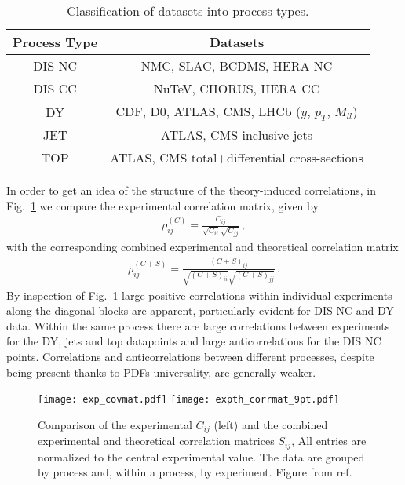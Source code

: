     \begin{table}[t]
        \centering
        \renewcommand*{\arraystretch}{1.3}
        \begin{tabular}{|c|c|}
          \hline
          Process Type  & Datasets \\
          \hline
          DIS NC  &   NMC, SLAC, BCDMS, HERA NC \\
          DIS CC  &   NuTeV, CHORUS, HERA CC \\
          DY  & CDF, D0, ATLAS, CMS, LHCb ($y$, $p_T$, $M_{ll}$) \\
          JET  & ATLAS, CMS inclusive jets \\
          TOP  & ATLAS, CMS total+differential cross-sections \\
          \hline
        \end{tabular}
        \caption{\label{eq:expclassification}
         Classification of  datasets into  process types.
        }
    \end{table}
    In order to get an idea of the structure of the theory-induced correlations,
    in Fig.~\ref{fig:covmats} we compare the experimental correlation matrix, given by
    \begin{align}
        \rho^{(C)}_{ij} = \frac{C_{ij}}{\sqrt{C_{ii}}\sqrt{C_{jj}}}\,,
    \end{align}
    with the corresponding combined experimental and theoretical correlation matrix
    \begin{align}
        \rho^{(C+S)}_{ij} = \frac{\left(C+S\right)_{ij}}{ \sqrt{\left(C+S\right)_{ii}} \sqrt{\left(C+S\right)_{jj}} }\,.
    \end{align}
    By inspection of Fig.~\ref{fig:covmats} large positive correlations within individual experiments along 
    the diagonal blocks are apparent, particularly evident for DIS NC and DY data.
    Within the same process there are large correlations between experiments for the DY, jets and top datapoints 
    and large anticorrelations for the DIS NC points. Correlations and anticorrelations between different processes,
    despite being present thanks to PDFs universality, are generally weaker.

    \begin{figure}[t!]
    \begin{center}
        \texttt{[image: exp\_covmat.pdf]}
        \texttt{[image: expth\_corrmat\_9pt.pdf]}
        \caption{\small Comparison of the  experimental $C_{ij}$ (left)
        and the combined experimental and theoretical correlation matrices $S_{ij}$, 
        All entries are normalized to the central  experimental value.
        The data are grouped by process and, within a process, by experiment. Figure from ref.~\cite{AbdulKhalek:2019ihb}.} 
        \label{fig:covmats}     
    \end{center}
    \end{figure}

